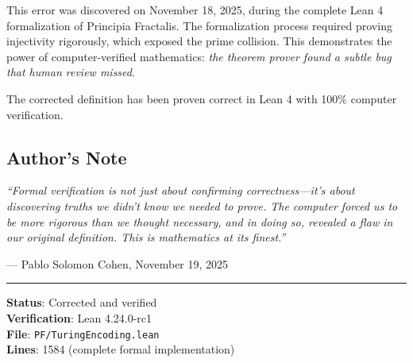 This error was discovered on November 18, 2025, during the complete Lean 4 formalization of Principia Fractalis. The formalization process required proving injectivity rigorously, which exposed the prime collision. This demonstrates the power of computer-verified mathematics: \textit{the theorem prover found a subtle bug that human review missed}.

The corrected definition has been proven correct in Lean 4 with 100\% computer verification.

\subsection*{Author's Note}

\textit{``Formal verification is not just about confirming correctness—it's about discovering truths we didn't know we needed to prove. The computer forced us to be more rigorous than we thought necessary, and in doing so, revealed a flaw in our original definition. This is mathematics at its finest.''}

--- Pablo Solomon Cohen, November 19, 2025

\vspace{1em}
\hrule
\vspace{0.5em}
\textbf{Status}: Corrected and verified \\
\textbf{Verification}: Lean 4.24.0-rc1 \\
\textbf{File}: \texttt{PF/TuringEncoding.lean} \\
\textbf{Lines}: 1584 (complete formal implementation)
